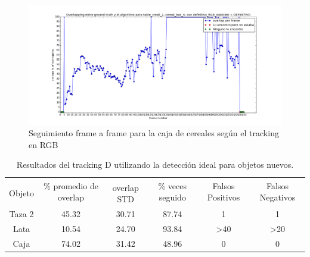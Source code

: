 \begin{figure}
	\centering
	\includegraphics[width=\textwidth]{img/seguimientoframeaframe-rgb-nuevo-caja.png}
	\caption{Seguimiento frame a frame para la caja de cereales según el tracking en RGB}
	\label{frame_frame_rgb_nuevo}
\end{figure}



\begin{table}
    \begin{tabular}{|c|c|c|c|c|c|}
    \hline
    & \multirow{2}{2.4cm}{\% promedio de overlap} & & \multirow{2}{2cm}{\% veces seguido} & \multirow{2}{1.6cm}{Falsos Positivos} & \multirow{2}{1.6cm}{Falsos Negativos}\\
	Objeto & & overlap STD & & &\\
    \hline
    Taza 2  & 45.32      & 30.71       & 87.74             & 1                & 1\\
    \hline
    Lata    & 10.54      & 24.70       & 93.84             & >40              & >20\\
    \hline
    Caja    & 74.02      & 31.42       & 48.96             & 0                & 0\\
    \hline
    \end{tabular}
\caption{Resultados del tracking D utilizando la detección ideal para objetos nuevos.}
\label{tabla_d_nuevos}
\end{table}

